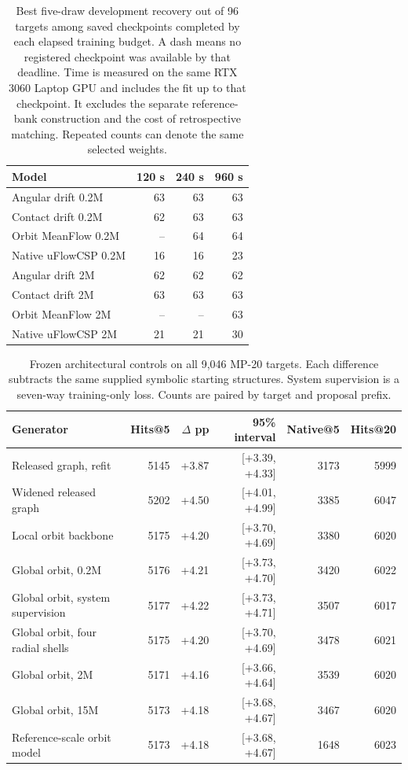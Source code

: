 \begin{table}[!htbp]\centering\small\setlength{\tabcolsep}{3.6pt}
\caption{Best five-draw development recovery out of 96 targets among saved checkpoints completed by each elapsed training budget. A dash means no registered checkpoint was available by that deadline. Time is measured on the same RTX 3060 Laptop GPU and includes the fit up to that checkpoint. It excludes the separate reference-bank construction and the cost of retrospective matching. Repeated counts can denote the same selected weights.}
\begin{tabular}{lrrr}\hline
Model & 120 s & 240 s & 960 s\\\hline
Angular drift 0.2M & 63 & 63 & 63\\
Contact drift 0.2M & 62 & 63 & 63\\
Orbit MeanFlow 0.2M & -- & 64 & 64\\
Native uFlowCSP 0.2M & 16 & 16 & 23\\
Angular drift 2M & 62 & 62 & 62\\
Contact drift 2M & 63 & 63 & 63\\
Orbit MeanFlow 2M & -- & -- & 63\\
Native uFlowCSP 2M & 21 & 21 & 30\\
\hline\end{tabular}\end{table}

\begin{table}[!htbp]\centering\small\setlength{\tabcolsep}{3.6pt}
\caption{Frozen architectural controls on all 9,046 MP-20 targets. Each difference subtracts the same supplied symbolic starting structures. System supervision is a seven-way training-only loss. Counts are paired by target and proposal prefix.}
\begin{tabular}{lrrrrr}\hline
Generator & Hits@5 & $\Delta$ pp & 95\% interval & Native@5 & Hits@20\\\hline
Released graph, refit & 5145 & +3.87 & [+3.39, +4.33] & 3173 & 5999\\
Widened released graph & 5202 & +4.50 & [+4.01, +4.99] & 3385 & 6047\\
Local orbit backbone & 5175 & +4.20 & [+3.70, +4.69] & 3380 & 6020\\
Global orbit, 0.2M & 5176 & +4.21 & [+3.73, +4.70] & 3420 & 6022\\
Global orbit, system supervision & 5177 & +4.22 & [+3.73, +4.71] & 3507 & 6017\\
Global orbit, four radial shells & 5175 & +4.20 & [+3.70, +4.69] & 3478 & 6021\\
Global orbit, 2M & 5171 & +4.16 & [+3.66, +4.64] & 3539 & 6020\\
Global orbit, 15M & 5173 & +4.18 & [+3.68, +4.67] & 3467 & 6020\\
Reference-scale orbit model & 5173 & +4.18 & [+3.68, +4.67] & 1648 & 6023\\
\hline\end{tabular}\end{table}

